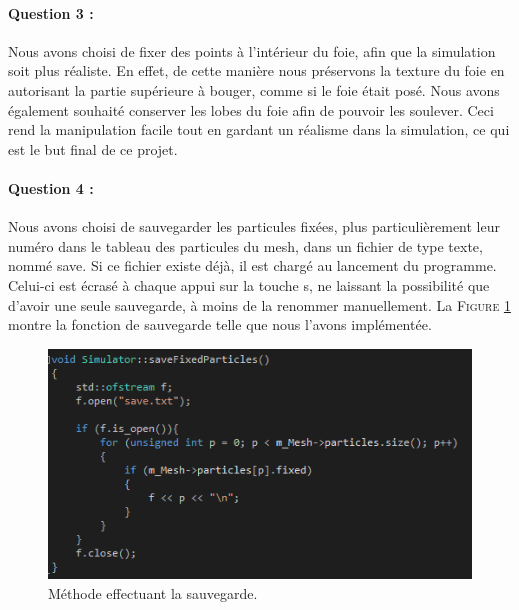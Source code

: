 \documentclass[a4paper,12pt]{article}
\begin{document}
\paragraph{Question 3 :} Nous avons choisi de fixer des points à l'intérieur du foie, afin que la simulation soit plus réaliste. En effet, de cette manière nous préservons la \og{}texture\fg{} du foie en autorisant la partie supérieure à bouger, comme si le foie était posé. Nous avons également souhaité conserver les lobes du foie afin de pouvoir les soulever. Ceci rend la manipulation facile tout en gardant un réalisme dans la simulation, ce qui est le but final de ce projet.

\paragraph{Question 4 :} Nous avons choisi de sauvegarder les particules fixées, plus particulièrement leur numéro dans le tableau des particules du mesh, dans un fichier de type texte, nommé \og{}save\fg{}. Si ce fichier existe déjà, il est chargé au lancement du programme. Celui-ci est écrasé à chaque appui sur la touche \og{}s\fg{}, ne laissant la possibilité que d'avoir une seule sauvegarde, à moins de la renommer manuellement. La \textsc{Figure} \ref{fig:save} montre la fonction de sauvegarde telle que nous l'avons implémentée. 
\begin{figure}[ht!]
  \centering
  \includegraphics{images/save.png}
  \caption{Méthode effectuant la sauvegarde.}
  \label{fig:save}
\end{figure}
\end{document}
